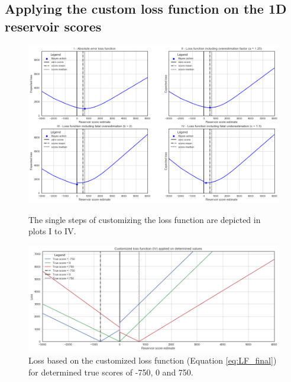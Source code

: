 			\subsection{Applying the custom loss function on the 1D reservoir scores}

			\begin{figure}[p!]
				\centering
				\includegraphics[width=1\textwidth]{Figures/LF_4steps.png}
				\caption{The single steps of customizing the loss function are depicted in plots I to IV.}\label{fig:LF_4steps}
				\centering
				\includegraphics[width=1\textwidth]{Figures/LF4_det_values.png}
				\caption{Loss based on the customized loss function (Equation \ref{eq:LF_final}) for determined true scores of -750, 0 and 750.}\label{fig:LF4_det_values}
			\end{figure}			
